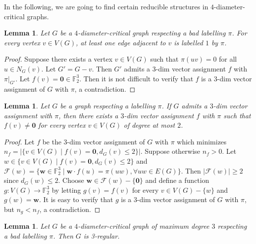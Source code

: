 \documentclass[
final
]{dmtcs-episciences}
\newtheorem{lemma}[theorem]{Lemma}
\begin{document}
In the following, we are going to find certain reducible structures in $4$-diameter-critical graphs.

\begin{lemma}\label{lemma: reducible all zero adjacent edges}
Let $G$ be a $4$-diameter-critical graph respecting a bad labelling $\pi$.
For every vertex $v \in V(G)$, at least one edge adjacent to $v$ is labelled $1$ by $\pi$.
\end{lemma}

\begin{proof}
    Suppose there exists a vertex $v \in V(G)$ such that $\pi(uv) = 0$ for all $u \in N_G(v)$.
    Let $G' = G - v$. Then  $G'$ admits a $3$-dim vector assignment $f$ with  $\pi|_{G'}$.
    Let $f(v) = \mathbf{0} \in \mathbb{F}_2^3$. Then it is not difficult to  verify that $f$ is a $3$-dim vector assignment of $G$ with  $\pi$, a contradiction.
\end{proof}

\begin{lemma}\label{lemma: nonzero, degree <= 2}
    Let $G$ be a graph respecting a labelling $\pi$.
    If $G$ admits a $3$-dim vector assignment with $\pi$, then there exists a $3$-dim vector assignment $f$ with $\pi$ such that $f(v) \neq \mathbf{0}$ for every vertex $v \in V(G)$ of degree at most $2$.
\end{lemma}

\begin{proof}
    Let $f$ be the $3$-dim vector assignment of $G$ with $\pi$ which minimizes $n_f = |\{ v \in V(G) \mid f(v) = \mathbf{0}, d_G(v) \le 2\}|$.
    Suppose otherwise $n_f > 0$. Let $w\in \{ v \in V(G) \mid f(v) = \mathbf{0}, d_G(v) \le 2\}$ 
    and $\mathcal{F}(w) =  \{ \mathbf{w } \in \mathbb{F}_2^3 \mid \mathbf{w \cdot} f(u) = \pi(uw), \forall uw \in E(G) \}$. Then $|\mathcal{F}(w)| \ge 2$ since $d_G(w) \le 2$.
    Choose $\mathbf{w }\in \mathcal{F}(w)-\{\mathbf{ 0}\}$ and define a function $g: V(G)\rightarrow \mathbb{F}_2^3$ by letting $g(v) = f(v)$ for every $v \in V(G) - \{w\}$ and $g(w) = \mathbf{w}$. It is easy to verify that $g$ is a $3$-dim vector assignment of $G$ with $\pi$, but $n_g < n_f$, a contradiction.
\end{proof}

\begin{lemma}\label{lemma: reducible 3-regular}
Let $G$ be a $4$-diameter-critical graph of maximum degree $3$ respecting a bad labelling $\pi$.
Then $G$ is 3-regular.
\end{lemma}
\end{document}

